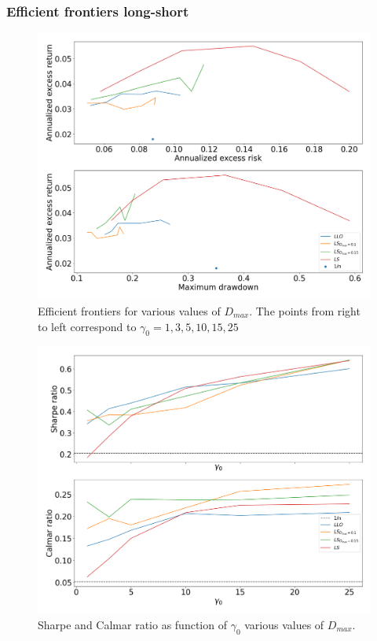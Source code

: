 \subsubsection*{Efficient frontiers long-short}

\begin{figure}[H]
    \centering
    \includegraphics[width=1\textwidth]{analysis/portfolio_exercise/images/mle/frontier_ls.png}
    \caption[Efficient frontiers for various values of $D_{max}$]{Efficient frontiers for various values of $D_{max}$. The points from right to left correspond to $\gamma_0=1,3,5,10,15,25$}
    \label{fig:MPC_frontier_ls}
\end{figure}

\begin{figure}[H]
    \centering
    \includegraphics[width=1\textwidth]{analysis/portfolio_exercise/images/mle/sharpe_frontier_ls.png}
    \caption[Sharpe and Calmar ratio as function of $\gamma_0$ various values of $D_{max}$]{Sharpe and Calmar ratio as function of $\gamma_0$ various values of $D_{max}$.}
    \label{fig:MPC_sharpe_frontier_ls}
\end{figure}

